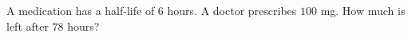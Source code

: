 A medication has a half-life of $6$ hours. A doctor prescribes $100$ mg. How much is left after $78$ hours?
